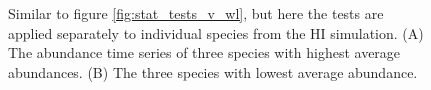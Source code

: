 \begin{figure}[hb]
	\centering
     \caption{Similar to figure \ref{fig:stat_tests_v_wl}, but here the tests are applied separately to individual species from the HI simulation. (A) The abundance time series of three species with highest average abundances. (B) The three species with lowest average abundance.} 
     \label{fig:sp_stat_tests_v_wl}   
\end{figure}

\newpage



